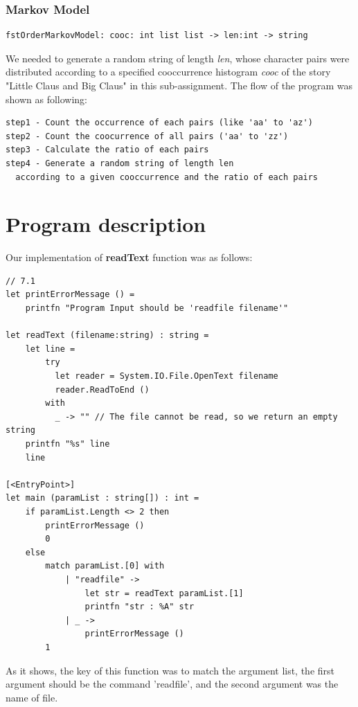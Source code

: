 \documentclass{article}
\begin{document}
\subsubsection{Markov Model}
\begin{lstlisting}
fstOrderMarkovModel: cooc: int list list -> len:int -> string
\end{lstlisting}

We needed to generate a random string of length \emph{len}, whose character pairs were distributed according to a specified cooccurrence histogram \emph{cooc} of the story "Little Claus and Big Claus" in this sub-assignment. The flow of the program was shown as following:

\begin{lstlisting}
step1 - Count the occurrence of each pairs (like 'aa' to 'az')
step2 - Count the coocurrence of all pairs ('aa' to 'zz')
step3 - Calculate the ratio of each pairs
step4 - Generate a random string of length len
  according to a given cooccurrence and the ratio of each pairs
\end{lstlisting}


\section{Program description}

Our implementation of \textbf{readText} function was as follows:

\begin{lstlisting}
// 7.1
let printErrorMessage () =
    printfn "Program Input should be 'readfile filename'"

let readText (filename:string) : string = 
    let line = 
        try
          let reader = System.IO.File.OpenText filename
          reader.ReadToEnd ()
        with
          _ -> "" // The file cannot be read, so we return an empty string
    printfn "%s" line
    line

[<EntryPoint>]
let main (paramList : string[]) : int = 
    if paramList.Length <> 2 then
        printErrorMessage ()
        0
    else
        match paramList.[0] with
            | "readfile" ->
                let str = readText paramList.[1]
                printfn "str : %A" str
            | _ ->
                printErrorMessage ()
        1    
\end{lstlisting}

As it shows, the key of this function was to match the argument list, the first argument should be the command 'readfile', and the second argument was the name of file.
\end{document}
